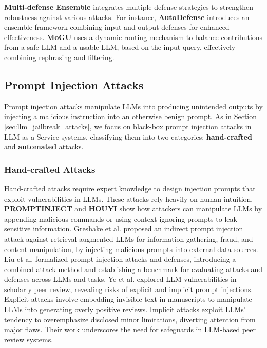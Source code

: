\textbf{Multi-defense Ensemble} integrates multiple defense strategies to strengthen robustness against various attacks. For instance, \textbf{AutoDefense} \cite{lu2024autojailbreak} introduces an ensemble framework combining input and output defenses for enhanced effectiveness. \textbf{MoGU} \cite{du2024mogu} uses a dynamic routing mechanism to balance contributions from a safe LLM and a usable LLM, based on the input query, effectively combining rephrasing and filtering.

\subsection{Prompt Injection Attacks}
\label{sec:llm_prompt_injection_attacks}

Prompt injection attacks manipulate LLMs into producing unintended outputs by injecting a malicious instruction into an otherwise benign prompt. As in Section \ref{sec:llm_jailbreak_attacks}, we focus on black-box prompt injection attacks in LLM-as-a-Service systems, classifying them into two categories: \textbf{hand-crafted} and \textbf{automated} attacks.

\subsubsection{Hand-crafted Attacks}

Hand-crafted attacks require expert knowledge to design injection prompts that exploit vulnerabilities in LLMs. These attacks rely heavily on human intuition. \textbf{PROMPTINJECT} \cite{perez2022ignore} and \textbf{HOUYI} \cite{liu2023prompt} show how attackers can manipulate LLMs by appending malicious commands or using context-ignoring prompts to leak sensitive information. Greshake et al. \cite{greshake2023not} proposed an indirect prompt injection attack against retrieval-augmented LLMs for information gathering, fraud, and content manipulation, by injecting malicious prompts into external data sources.
Liu et al. \cite{liu2024formalizing} formalized prompt injection attacks and defenses, introducing a combined attack method and establishing a benchmark for evaluating attacks and defenses across LLMs and tasks.
Ye et al. \cite{ye2024we} explored LLM vulnerabilities in scholarly peer review, revealing risks of explicit and implicit prompt injections. Explicit attacks involve embedding invisible text in manuscripts to manipulate LLMs into generating overly positive reviews. Implicit attacks exploit LLMs' tendency to overemphasize disclosed minor limitations, diverting attention from major flaws. Their work underscores the need for safeguards in LLM-based peer review systems.

